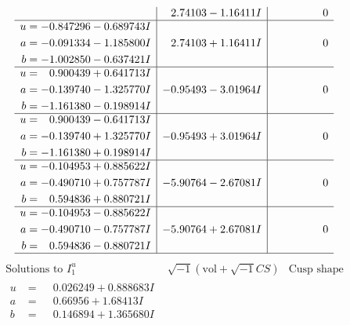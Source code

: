 \documentclass[1p]{elsarticle_modified}
\theoremstyle{definition}
\newcommand{\I}{\sqrt{-1}}
\begin{document}
$$\begin{array}{c|c|c}
 & \phantom{-}2.74103 - 1.16411 I & \phantom{-0.000000 } 0 \\ \hline\begin{aligned}
u &= -0.847296 - 0.689743 I \\
a &= -0.091334 - 1.185800 I \\
b &= -1.002850 - 0.637421 I\end{aligned}
 & \phantom{-}2.74103 + 1.16411 I & \phantom{-0.000000 } 0 \\ \hline\begin{aligned}
u &= \phantom{-}0.900439 + 0.641713 I \\
a &= -0.139740 - 1.325770 I \\
b &= -1.161380 - 0.198914 I\end{aligned}
 & -0.95493 - 3.01964 I & \phantom{-0.000000 } 0 \\ \hline\begin{aligned}
u &= \phantom{-}0.900439 - 0.641713 I \\
a &= -0.139740 + 1.325770 I \\
b &= -1.161380 + 0.198914 I\end{aligned}
 & -0.95493 + 3.01964 I & \phantom{-0.000000 } 0 \\ \hline\begin{aligned}
u &= -0.104953 + 0.885622 I \\
a &= -0.490710 + 0.757787 I \\
b &= \phantom{-}0.594836 + 0.880721 I\end{aligned}
 & -5.90764 - 2.67081 I & \phantom{-0.000000 } 0 \\ \hline\begin{aligned}
u &= -0.104953 - 0.885622 I \\
a &= -0.490710 - 0.757787 I \\
b &= \phantom{-}0.594836 - 0.880721 I\end{aligned}
 & -5.90764 + 2.67081 I & \phantom{-0.000000 } 0\\
 \hline 
 \end{array}$$\newpage$$\begin{array}{c|c|c}  
\text{Solutions to }I^u_{1}& \I (\text{vol} + \sqrt{-1}CS) & \text{Cusp shape}\\
 \hline 
\begin{aligned}
u &= \phantom{-}0.026249 + 0.888683 I \\
a &= \phantom{-}0.66956 + 1.68413 I \\
b &= \phantom{-}0.146894 + 1.365680 I\end{aligned}

\end{array}$$
\end{document}

